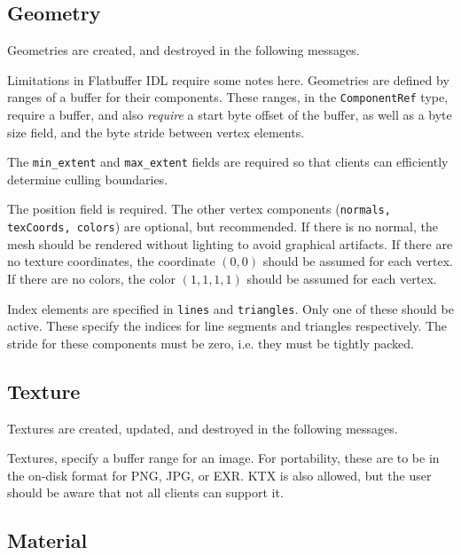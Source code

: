 \documentclass[11pt, oneside]{amsart}
\begin{document}
\subsection{Geometry}

Geometries are created, and destroyed in the following messages.



Limitations in Flatbuffer IDL require some notes here. Geometries are defined by ranges of a buffer for their components. These ranges, in the \texttt{ComponentRef} type, require a buffer, and also \textit{require} a start byte offset of the buffer, as well as a byte size field, and the byte stride between vertex elements. 

The \texttt{min\_extent} and \texttt{max\_extent} fields are required so that clients can efficiently determine culling boundaries. 

The position field is required. The other vertex components (\texttt{normals, texCoords, colors}) are optional, but recommended. If there is no normal, the mesh should be rendered without lighting to avoid graphical artifacts. If there are no texture coordinates, the coordinate $(0,0)$ should be assumed for each vertex. If there are no colors, the color $(1,1,1,1)$ should be assumed for each vertex. 

Index elements are specified in \texttt{lines} and \texttt{triangles}. Only one of these should be active. These specify the indices for line segments and triangles respectively. The stride for these components must be zero, i.e. they must be tightly packed.

\subsection{Texture} 

Textures are created, updated, and destroyed in the following messages.



Textures, specify a buffer range for an image. For portability, these are to be in the on-disk format for PNG, JPG, or EXR. KTX is also allowed, but the user should be aware that not all clients can support it.

\subsection{Material} 
\end{document}
